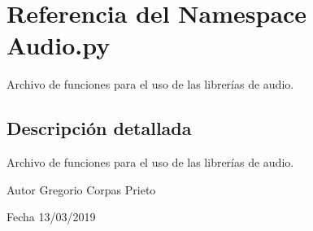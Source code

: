 \hypertarget{namespaceAudio_1_1py}{}\section{Referencia del Namespace Audio.\+py}
\label{namespaceAudio_1_1py}


Archivo de funciones para el uso de las librerías de audio.  




\subsection{Descripción detallada}
Archivo de funciones para el uso de las librerías de audio. 

\begin{DoxyAuthor}{Autor}
Gregorio Corpas Prieto 
\end{DoxyAuthor}
\begin{DoxyDate}{Fecha}
13/03/2019 
\end{DoxyDate}
